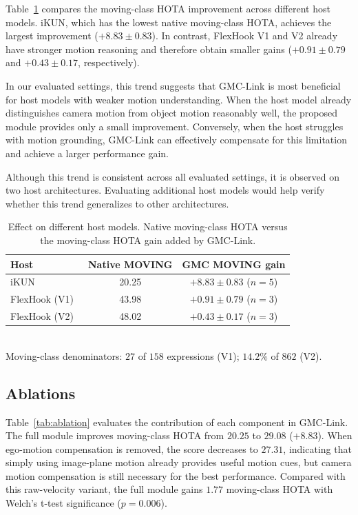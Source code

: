 \documentclass[sigconf,anonymous,nonacm]{acmart}
\begin{document}
Table~\ref{tab:deficit} compares the moving-class HOTA improvement across different host models. iKUN, which has the lowest native moving-class HOTA, achieves the largest improvement ($+8.83 \pm 0.83$). In contrast, FlexHook V1 and V2 already have stronger motion reasoning and therefore obtain smaller gains ($+0.91 \pm 0.79$ and $+0.43 \pm 0.17$, respectively).

In our evaluated settings, this trend suggests that GMC-Link is most beneficial for host models with weaker motion understanding. When the host model already distinguishes camera motion from object motion reasonably well, the proposed module provides only a small improvement. Conversely, when the host struggles with motion grounding, GMC-Link can effectively compensate for this limitation and achieve a larger performance gain.

Although this trend is consistent across all evaluated settings, it is observed on two host architectures. Evaluating additional host models would help verify whether this trend generalizes to other architectures.

\begin{table}[t]
\centering
\caption{Effect on different host models. Native moving-class HOTA versus the moving-class HOTA gain added by GMC-Link.}
\label{tab:deficit}
\small
\begin{tabular}{lcc}
\toprule
Host & Native MOVING & GMC MOVING gain \\
\midrule
iKUN~\cite{ikun}             & 20.25 & $+8.83 \pm 0.83$ ($n{=}5$) \\
FlexHook (V1)~\cite{flexhook}  & 43.98 & $+0.91 \pm 0.79$ ($n{=}3$) \\
FlexHook (V2)~\cite{flexhook}  & 48.02 & $+0.43 \pm 0.17$ ($n{=}3$) \\
\bottomrule
\end{tabular}
\\[2pt]
{\footnotesize Moving-class denominators: $27$ of $158$ expressions (V1); $14.2\%$ of $862$ (V2).}
\end{table}

\subsection{Ablations}
\label{sec:ablation}

Table~\ref{tab:ablation} evaluates the contribution of each component in GMC-Link. The full module improves moving-class HOTA from $20.25$ to $29.08$ ($+8.83$). When ego-motion compensation is removed, the score decreases to $27.31$, indicating that simply using image-plane motion already provides useful motion cues, but camera motion compensation is still necessary for the best performance. Compared with this raw-velocity variant, the full module gains $1.77$ moving-class HOTA with Welch's t-test significance ($p{=}0.006$).
\end{document}
